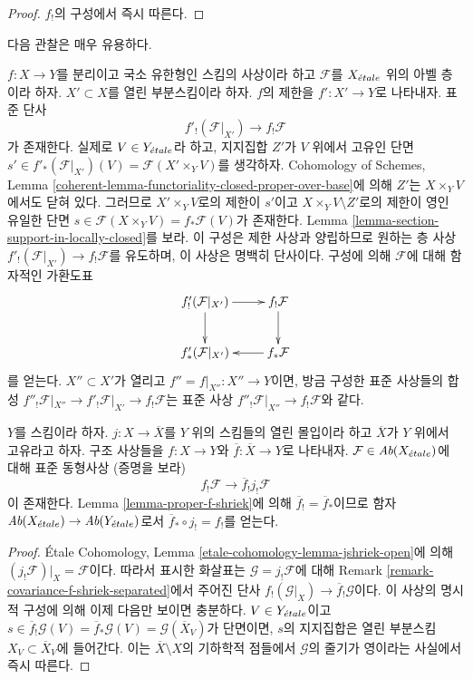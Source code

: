 \begin{proof}
$f_!$의 구성에서 즉시 따른다.
\end{proof}

\noindent
다음 관찰은 매우 유용하다.

\begin{remark}
\label{remark-covariance-f-shriek-separated}
$f : X \to Y$를 분리이고 국소 유한형인 스킴의 사상이라 하고
$\mathcal{F}$를 $X_{\acute{e}tale}$ 위의 아벨 층이라 하자.
$X' \subset X$를 열린 부분스킴이라 하자. $f$의 제한을
$f' : X' \to Y$로 나타내자. 표준 단사
$$
f'_!(\mathcal{F}|_{X'}) \longrightarrow f_!\mathcal{F}
$$
가 존재한다. 실제로 $V \in Y_{\acute{e}tale}$라 하고, 지지집합 $Z'$가
$V$ 위에서 고유인 단면
$s' \in f'_*(\mathcal{F}|_{X'})(V) = \mathcal{F}(X' \times_Y V)$를
생각하자. Cohomology of Schemes, Lemma
\ref{coherent-lemma-functoriality-closed-proper-over-base}에 의해 $Z'$는
$X \times_Y V$에서도 닫혀 있다. 그러므로 $X' \times_Y V$로의 제한이
$s'$이고 $X \times_Y V \setminus Z'$로의 제한이 영인 유일한 단면
$s \in \mathcal{F}(X \times_Y V) = f_*\mathcal{F}(V)$가 존재한다.
Lemma \ref{lemma-section-support-in-locally-closed}를 보라. 이 구성은
제한 사상과 양립하므로 원하는 층 사상
$f'_!(\mathcal{F}|_{X'}) \to f_!\mathcal{F}$를 유도하며, 이 사상은
명백히 단사이다. 구성에 의해 $\mathcal{F}$에 대해 함자적인 가환도표
$$
\xymatrix{
f'_!(\mathcal{F}|_{X'}) \ar[r] \ar[d] &
f_!\mathcal{F} \ar[d] \\
f'_*(\mathcal{F}|_{X'}) &
f_*\mathcal{F} \ar[l]
}
$$
를 얻는다. $X'' \subset X'$가 열리고
$f'' = f|_{X''} : X'' \to Y$이면, 방금 구성한 표준 사상들의 합성
$f''_!\mathcal{F}|_{X''} \to f'_!\mathcal{F}|_{X'} \to
f_!\mathcal{F}$는 표준 사상
$f''_!\mathcal{F}|_{X''} \to f_!\mathcal{F}$와 같다.
\end{remark}

\begin{lemma}
\label{lemma-compactify-f-shriek-separated}
$Y$를 스킴이라 하자. $j : X \to \overline{X}$를 $Y$ 위의 스킴들의
열린 몰입이라 하고 $\overline{X}$가 $Y$ 위에서 고유라고 하자.
구조 사상들을 $f : X \to Y$와
$\overline{f} : \overline{X} \to Y$로 나타내자.
$\mathcal{F} \in \textit{Ab}(X_{\acute{e}tale})$에 대해 표준 동형사상
(증명을 보라)
$$
f_!\mathcal{F} \longrightarrow \overline{f}_!j_!\mathcal{F}
$$
이 존재한다. Lemma \ref{lemma-proper-f-shriek}에 의해
$\overline{f}_! = \overline{f}_*$이므로 함자
$\textit{Ab}(X_{\acute{e}tale}) \to \textit{Ab}(Y_{\acute{e}tale})$로서
$\overline{f}_* \circ j_! = f_!$를 얻는다.
\end{lemma}

\begin{proof}
\'Etale Cohomology, Lemma
\ref{etale-cohomology-lemma-jshriek-open}에 의해
$(j_!\mathcal{F})|_X = \mathcal{F}$이다. 따라서 표시한 화살표는
$\mathcal{G} = j_!\mathcal{F}$에 대해 Remark
\ref{remark-covariance-f-shriek-separated}에서 주어진 단사
$f_!(\mathcal{G}|_X) \to \overline{f}_!\mathcal{G}$이다.
이 사상의 명시적 구성에 의해 이제 다음만 보이면 충분하다.
$V \in Y_{\acute{e}tale}$이고
$s \in \overline{f}_!\mathcal{G}(V) =
\overline{f}_*\mathcal{G}(V) = \mathcal{G}(\overline{X}_V)$가
단면이면, $s$의 지지집합은 열린 부분스킴
$X_V \subset \overline{X}_V$에 들어간다. 이는
$\overline{X} \setminus X$의 기하학적 점들에서 $\mathcal{G}$의 줄기가
영이라는 사실에서 즉시 따른다.
\end{proof}

